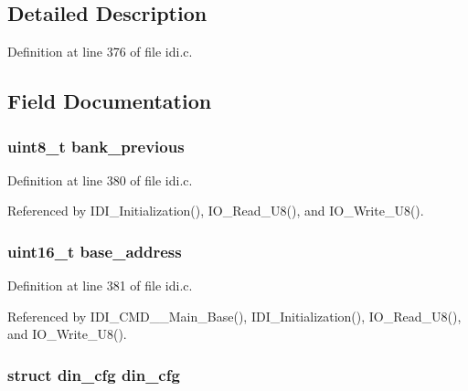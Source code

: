 \subsection{Detailed Description}


Definition at line 376 of file idi.\+c.



\subsection{Field Documentation}
\hypertarget{structidi__dataset_aae9e92994011c0d276bdd28589d9aa71}{
\subsubsection[{bank\+\_\+previous}]{\setlength{\rightskip}{0pt plus 5cm}uint8\+\_\+t bank\+\_\+previous}}\label{structidi__dataset_aae9e92994011c0d276bdd28589d9aa71}


Definition at line 380 of file idi.\+c.



Referenced by I\+D\+I\+\_\+\+Initialization(), I\+O\+\_\+\+Read\+\_\+\+U8(), and I\+O\+\_\+\+Write\+\_\+\+U8().

\hypertarget{structidi__dataset_a27de55c6cee77e53ec9631f1f489a97a}{
\subsubsection[{base\+\_\+address}]{\setlength{\rightskip}{0pt plus 5cm}uint16\+\_\+t base\+\_\+address}}\label{structidi__dataset_a27de55c6cee77e53ec9631f1f489a97a}


Definition at line 381 of file idi.\+c.



Referenced by I\+D\+I\+\_\+\+C\+M\+D\+\_\+\+\_\+\+Main\+\_\+\+Base(), I\+D\+I\+\_\+\+Initialization(), I\+O\+\_\+\+Read\+\_\+\+U8(), and I\+O\+\_\+\+Write\+\_\+\+U8().

\hypertarget{structidi__dataset_a295c955273759b0f83aaabe50bd981f0}{
\subsubsection[{din\+\_\+cfg}]{\setlength{\rightskip}{0pt plus 5cm}struct {\bf din\+\_\+cfg} {\bf din\+\_\+cfg}}}\label{structidi__dataset_a295c955273759b0f83aaabe50bd981f0}


